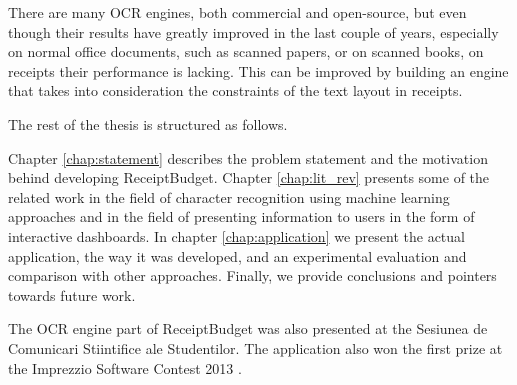 There are many OCR engines, both commercial and open-source, but even though their results have greatly improved in the last couple of years, especially on normal office documents, such as scanned papers, or on scanned books, on receipts their performance is lacking. This can be improved by building an engine that takes into consideration the constraints of the text layout in receipts. 

The rest of the thesis is structured as follows.

Chapter \ref{chap:statement} describes the problem statement and the motivation behind developing ReceiptBudget. Chapter \ref{chap:lit_rev} presents some of the related work in the field of character recognition using machine learning approaches and in the field of presenting information to users in the form of interactive dashboards. In chapter \ref{chap:application} we present the actual application, the way it was developed, and an experimental evaluation and comparison with other approaches. Finally, we provide conclusions and pointers towards future work. 

The OCR engine part of ReceiptBudget was also presented at the Sesiunea de Comunicari Stiintifice ale Studentilor. The application also won the first prize at the Imprezzio Software Contest 2013 \cite{imprezzio}. 